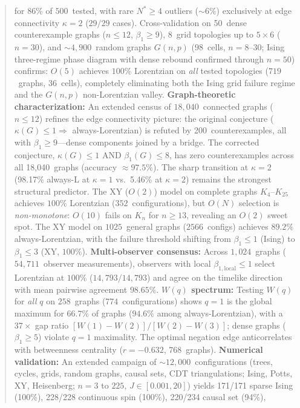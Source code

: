 \documentclass[11pt]{article}
\theoremstyle{definition}
\theoremstyle{remark}
\begin{document}
\begin{abstract}
for $86\%$ of $500$~tested, with rare $N^* \geq 4$ outliers (${\sim}6\%$)
exclusively at edge connectivity $\kappa = 2$ ($29/29$ cases).
Cross-validation on 50~dense counterexample graphs ($n \leq 12$,
$\beta_1 \geq 9$), 8~grid topologies up to $5 \times 6$ ($n = 30$),
and ${\sim}4{,}900$~random graphs $G(n,p)$ ($98$~cells, $n = 8$--$30$;
Ising three-regime phase diagram with dense rebound confirmed through
$n = 50$) confirms: $O(5)$ achieves $100\%$ Lorentzian on \emph{all} tested
topologies ($719$~graphs, $36$~cells), completely eliminating both the
Ising grid failure regime and the $G(n,p)$ non-Lorentzian valley.
\textbf{Graph-theoretic characterization:} An extended census of $18{,}040$~connected
graphs ($n \leq 12$) refines the edge connectivity picture: the original
conjecture ($\kappa(G) \leq 1 \Rightarrow$ always-Lorentzian) is refuted
by 200~counterexamples, all with $\beta_1 \geq 9$---dense components joined
by a bridge. The corrected conjecture, $\kappa(G) \leq 1$ AND $\beta_1(G) \leq 8$,
has zero counterexamples across all 18,040~graphs (accuracy $\approx 97.5\%$).
The sharp transition at $\kappa = 2$ (98.17\% always-L at $\kappa = 1$ vs.\ 5.46\%
at $\kappa = 2$) remains the strongest structural predictor.
The XY ($O(2)$) model on complete graphs $K_4$--$K_{25}$ achieves
$100\%$ Lorentzian ($352$~configurations), but $O(N)$ selection is
\emph{non-monotone}: $O(10)$ fails on $K_n$ for $n \geq 13$,
revealing an $O(2)$ sweet spot.
The XY model on $1025$~general
graphs ($2566$~configs) achieves $89.2\%$ always-Lorentzian, with the failure threshold
shifting from $\beta_1 \leq 1$ (Ising) to $\beta_1 \leq 3$ (XY, $100\%$).
\textbf{Multi-observer consensus:} Across $1{,}024$~graphs ($54{,}711$~observer
measurements), observers with local $\beta_{1,\mathrm{local}} \leq 1$ select
Lorentzian at $100\%$ ($14{,}793/14{,}793$) and agree on the timelike direction
with mean pairwise agreement $98.65\%$.
\textbf{$W(q)$ spectrum:} Testing $W(q)$ for \emph{all} $q$ on $258$~graphs
($774$~configurations) shows $q = 1$ is the global maximum for $66.7\%$ of
graphs ($94.6\%$ among always-Lorentzian), with a $37\times$ gap ratio
$[W(1){-}W(2)] / [W(2){-}W(3)]$; dense graphs ($\beta_1 \geq 5$)
violate $q{=}1$ maximality. The optimal negation edge anticorrelates with
betweenness centrality ($r = -0.632$, $768$~graphs).
\textbf{Numerical validation:} An extended campaign of $\sim 12{,}000$~configurations
(trees, cycles, grids, random graphs, causal sets, CDT triangulations; Ising,
Potts, XY, Heisenberg; $n = 3$ to $225$, $J \in [0.001, 20]$) yields 171/171
sparse Ising (100\%), 228/228 continuous spin (100\%), 220/234 causal set (94\%),

\end{abstract}
\end{document}
